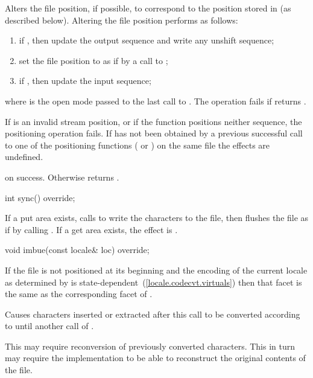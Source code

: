 \begin{itemdescr}
\pnum
Alters the file position, if possible, to correspond to the position
stored in  (as described below).
Altering the file position performs as follows:
\begin{enumerate}
\item
if
,
then update the output sequence and
write any unshift sequence;
\item
set the file position to  as if by a call to ;
\item
if
,
then update the input sequence;
\end{enumerate}
where  is the open mode passed to the last call to
.
The operation fails if
returns .

\pnum
If  is an invalid stream position, or if the function positions
neither sequence, the positioning operation fails.
If  has not been obtained by a previous successful call to one of
the positioning functions
(
or
)
on the same file the effects are undefined.

\pnum
\returns
{}
on success.
Otherwise returns
.
\end{itemdescr}

%
\begin{itemdecl}
int sync() override;
\end{itemdecl}

\begin{itemdescr}
\pnum
\effects
If a put area exists, calls
to write the characters to the file,
then flushes the file as if by calling .
If a get area exists, the effect is .
\end{itemdescr}

%
\begin{itemdecl}
void imbue(const locale& loc) override;
\end{itemdecl}

\begin{itemdescr}
\pnum
\requires
If the file is not positioned at its beginning and the encoding of the current
locale as determined by
is state-dependent~(\ref{locale.codecvt.virtuals})
then that facet is the same as
the corresponding facet of .

\pnum
\effects
Causes characters inserted or extracted after this call
to be converted according to  until another call of
.

\pnum
\remarks
This may require reconversion of previously converted characters.
This in turn may require the implementation to be able to reconstruct
the original contents of the file.
\end{itemdescr}

